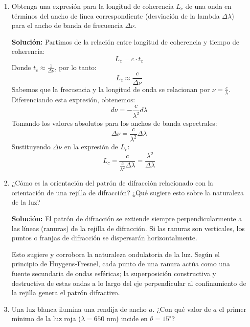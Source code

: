 \documentclass[12pt, letterpaper]{article}
\begin{document}
\begin{enumerate}
\begin{itemize}
			\item \textbf{Luz Roja} ($\lambda = 650\text{ nm}$):\\
			$L_c = \frac{(650 \times 10^{-9}\text{ m})^2}{20 \times 10^{-9}\text{ m}} = 21.125 \, \mu\text{m}$ \\
			$t_c = \frac{21.125 \times 10^{-6}\text{ m}}{3 \times 10^8\text{ m/s}} \approx 70.4\text{ fs}$
		\end{itemize}
		
		\item Obtenga una expresión para la longitud de coherencia $L_c$ de una onda en términos del ancho de línea correspondiente (desviación de la lambda $\Delta\lambda$) para el ancho de banda de frecuencia $\Delta\nu$.
		
		\textbf{Solución:}
		Partimos de la relación entre longitud de coherencia y tiempo de coherencia:
		$$ L_c = c \cdot t_c $$
		Donde $t_c \approx \frac{1}{\Delta\nu}$, por lo tanto:
		$$ L_c \approx \frac{c}{\Delta\nu} $$
		Sabemos que la frecuencia y la longitud de onda se relacionan por $\nu = \frac{c}{\lambda}$. Diferenciando esta expresión, obtenemos:
		$$ d\nu = -\frac{c}{\lambda^2} d\lambda $$
		Tomando los valores absolutos para los anchos de banda espectrales:
		$$ \Delta\nu = \frac{c}{\lambda^2} \Delta\lambda $$
		Sustituyendo $\Delta\nu$ en la expresión de $L_c$:
		$$ L_c = \frac{c}{\frac{c}{\lambda^2} \Delta\lambda} = \frac{\lambda^2}{\Delta\lambda} $$
		
		\item ¿Cómo es la orientación del patrón de difracción relacionado con la orientación de una rejilla de difracción? ¿Qué sugiere esto sobre la naturaleza de la luz? 
		
		\textbf{Solución:}
		El patrón de difracción se extiende siempre perpendicularmente a las líneas (ranuras) de la rejilla de difracción. Si las ranuras son verticales, los puntos o franjas de difracción se dispersarán horizontalmente.
		
		Esto sugiere y corrobora la naturaleza ondulatoria de la luz. Según el principio de Huygens-Fresnel, cada punto de una ranura actúa como una fuente secundaria de ondas esféricas; la superposición constructiva y destructiva de estas ondas a lo largo del eje perpendicular al confinamiento de la rejilla genera el patrón difractivo.
		
		\item Una luz blanca ilumina una rendija de ancho $a$. ¿Con qué valor de $a$ el primer mínimo de la luz roja ($\lambda=650\text{ nm}$) incide en $\theta=15^{\circ}$? 
		

\end{enumerate}
\end{document}
